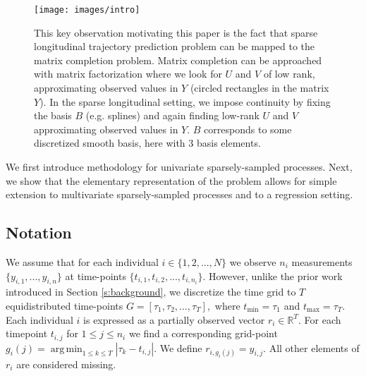 \documentclass[preprint]{imsart}
\numberwithin{equation}{section}
\theoremstyle{plain}
\newcommand{\R}{\mathbb{R}}
\DeclareMathOperator*{\argmin}{arg\,min}
\begin{document}

\begin{figure}[h]
  \texttt{[image: images/intro]}
  \caption{This key observation motivating this paper is the fact that sparse longitudinal trajectory prediction problem can be mapped to the matrix completion problem. Matrix completion can be approached with matrix factorization where we look for $U$ and $V$ of low rank, approximating observed values in $Y$ (circled rectangles in the matrix $Y$). In the sparse longitudinal setting, we impose continuity by fixing the basis $B$ (e.g. splines) and again finding low-rank $U$ and $V$ approximating observed values in $Y$. $B$ corresponds to some discretized smooth basis, here with $3$ basis elements.}
  \label{fig:idea}
\end{figure}

We first introduce methodology for univariate sparsely-sampled processes. Next, we show that the elementary representation of the problem allows for simple extension to multivariate sparsely-sampled processes and to a regression setting.

\subsection{Notation}

We assume that for each individual $i \in \{1,2,...,N\}$ we observe $n_i$ measurements $\{y_{i,1},...,y_{i,n}\}$ at time-points $\{t_{i,1},t_{i,2},...,t_{i,n_i}\}$. However, unlike the prior work introduced in Section \ref{s:background}, we discretize the time grid to $T$ equidistributed time-points $G = \left[\tau_1, \tau_2, ..., \tau_T\right],$ where $t_{\min} = \tau_1$ and $t_{\max} = \tau_T$. Each individual $i$ is expressed as a partially observed vector $r_i \in \R^T$. For each timepoint $t_{i,j}$ for $1 \leq j \leq n_i$ we find a corresponding grid-point $g_i(j) = \argmin_{1 \leq k \leq T}  |\tau_k - t_{i,j}|$. We define $r_{i,g_i(j)} = y_{i,j}$. All other elements of $r_i$ are considered missing.
\end{document}
